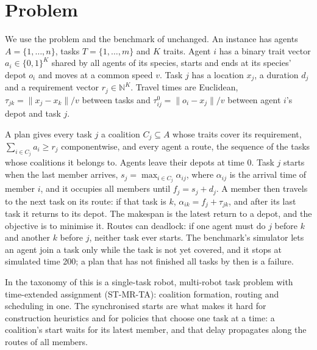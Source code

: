 \section{Problem}
\label{sec:problem}

We use the problem and the benchmark of \citet{dai2025heterogeneous} unchanged. An instance has agents
$A = \{1, \dots, n\}$, tasks $T = \{1, \dots, m\}$ and $K$ traits. Agent $i$ has a binary trait vector
$a_i \in \{0, 1\}^K$ shared by all agents of its species, starts and ends at its species' depot $o_i$ and moves at a
common speed $v$. Task $j$ has a location $x_j$, a duration $d_j$ and a requirement vector $r_j \in \mathbb{N}^K$. Travel
times are Euclidean, $\tau_{jk} = \lVert x_j - x_k \rVert / v$ between tasks and $\tau^0_{ij} = \lVert o_i - x_j \rVert
/ v$ between agent $i$'s depot and task $j$.

A plan gives every task $j$ a coalition $C_j \subseteq A$ whose traits cover its requirement,
$\sum_{i \in C_j} a_i \ge r_j$ componentwise,
and every agent a route, the sequence of the tasks whose coalitions it belongs to. Agents leave their depots at time 0.
Task $j$ starts when the last member arrives, $s_j = \max_{i \in C_j} \alpha_{ij}$, where $\alpha_{ij}$ is the arrival
time of member $i$, and it occupies all members until $f_j = s_j + d_j$. A member then travels to the next task on its
route: if that task is $k$, $\alpha_{ik} = f_j + \tau_{jk}$, and after its last task it returns to its depot. The
makespan is the latest return to a depot, and the objective is to minimise it. Routes can deadlock: if one agent must
do $j$ before $k$ and another $k$ before $j$, neither task ever starts. The benchmark's simulator lets an agent join a
task only while the task is not yet covered, and it stops at simulated time 200; a plan that has not finished all
tasks by then is a failure.

In the taxonomy of \citet{gerkey2004formal} this is a single-task robot, multi-robot task problem with time-extended
assignment (ST-MR-TA): coalition formation, routing and scheduling in one. The synchronised starts are what makes it
hard for construction heuristics and for policies that choose one task at a time: a coalition's start waits for its
latest member, and that delay propagates along the routes of all members.


